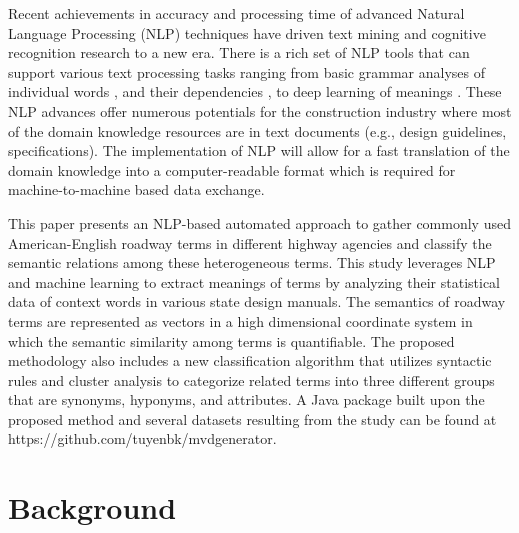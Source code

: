 \documentclass[Journal, BackFigs,NoLists, DoubleSpace]{ascelike}%
\begin{document}
\par
Recent achievements in accuracy and processing time of advanced Natural Language Processing (NLP) techniques have driven text mining and cognitive recognition research to a new era. There is a rich set of NLP tools that can support various text processing tasks ranging from basic grammar analyses of individual words \cite{Toutanova03,Cunningham02}, and their dependencies \cite{chen14}, to deep learning of meanings \cite{mikolov13a,pennington2014glove}. These NLP advances offer numerous potentials for the construction industry where most of the domain knowledge resources are in text documents (e.g., design guidelines, specifications). The implementation of NLP will allow for a fast translation of the domain knowledge into a computer-readable format which is required for machine-to-machine based data exchange.
\par
%
This paper presents an NLP-based automated approach to gather commonly used American-English roadway terms in different highway agencies and classify the semantic relations among these heterogeneous terms. This study leverages NLP and machine learning to extract meanings of terms by analyzing their statistical data of context words in various state design manuals. The semantics of roadway terms are represented as vectors in a high dimensional coordinate system in which the semantic similarity among terms is quantifiable. The proposed methodology also includes a new classification algorithm that utilizes syntactic rules and cluster analysis to categorize related terms into three different groups that are synonyms, hyponyms, and attributes. A Java package built upon the proposed method and several datasets resulting from the study can be found at https://github.com/tuyenbk/mvdgenerator. 
% 
\section{Background} \label{sec:litrev} %
%
\end{document}
